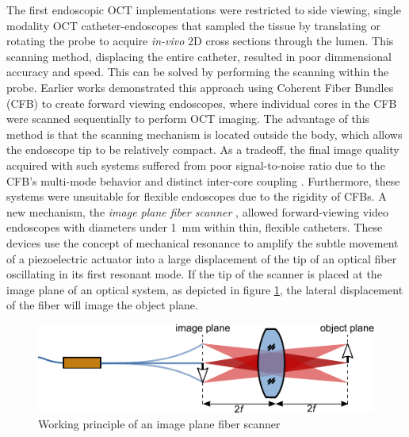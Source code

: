 \documentclass[10pt]{iopart}
\begin{document}
The first endoscopic OCT implementations were restricted to side viewing, single modality OCT catheter-endoscopes that sampled the tissue by translating \cite{Feldchtein1998} or rotating \cite{Tearney1994, Tearney1996} the probe to acquire \textit{in-vivo} 2D cross sections through the lumen. This scanning method, displacing the entire catheter, resulted in poor dimmensional accuracy and speed. This can be solved by performing the scanning within the probe. Earlier works demonstrated this approach using Coherent Fiber Bundles (CFB) to create forward viewing endoscopes, where individual cores in the CFB were scanned sequentially to perform OCT imaging. The advantage of this method is that the scanning mechanism is located outside the body, which allows the endoscope tip to be relatively compact. As a tradeoff, the final image quality acquired with such systems suffered from poor signal-to-noise ratio due to the CFB’s multi-mode behavior and distinct inter-core coupling \cite{Xie2005}. Furthermore, these systems were unsuitable for flexible endoscopes due to the rigidity of CFBs. A new mechanism, the \textit{image plane fiber scanner} \cite{Seibel2001}, allowed forward-viewing video endoscopes with diameters under \SI{1}{\milli\meter} within thin, flexible catheters. These devices use the concept of mechanical resonance to amplify the subtle movement of a piezoelectric actuator into a large displacement of the tip of an optical fiber oscillating in its first resonant mode. If the tip of the scanner is placed at the image plane of an optical system, as depicted in figure \ref{fig:fiberScanner}, the lateral displacement of the fiber will image the object plane. 

\begin{figure}[h!]\centering \includegraphics{figures/fiberScanner.pdf}
      \caption{Working principle of an image plane fiber scanner}
      \label{fig:fiberScanner}
\end{figure}
\end{document}
